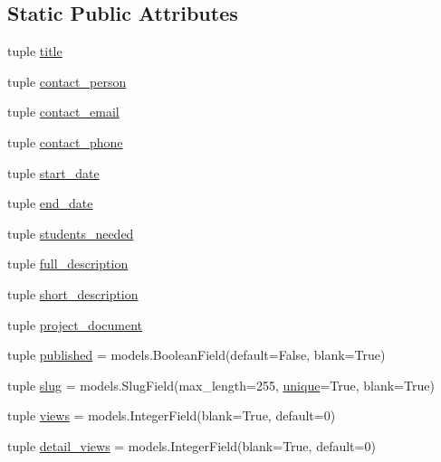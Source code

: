 \subsection*{Static Public Attributes}
\begin{DoxyCompactItemize}
\item 
tuple \hyperlink{classprojects_1_1models_1_1_project_a95d8dc587248d689b9d859eab80ded77}{title}
\item 
tuple \hyperlink{classprojects_1_1models_1_1_project_a5b80bb906ad5a041a2113b8bd70a2f7b}{contact\-\_\-person}
\item 
tuple \hyperlink{classprojects_1_1models_1_1_project_aa04216a538c373eb1c53f638e025d49a}{contact\-\_\-email}
\item 
tuple \hyperlink{classprojects_1_1models_1_1_project_a4f9549b40bff6b64d1ee32524b3c6dfb}{contact\-\_\-phone}
\item 
tuple \hyperlink{classprojects_1_1models_1_1_project_ae7c2fba1b45662e8ff60977fbe3df5d8}{start\-\_\-date}
\item 
tuple \hyperlink{classprojects_1_1models_1_1_project_a7f570ace2dbd44b86ebab9b717258216}{end\-\_\-date}
\item 
tuple \hyperlink{classprojects_1_1models_1_1_project_a520a39ed8efd4fef0a9fda1f3ea1aea3}{students\-\_\-needed}
\item 
tuple \hyperlink{classprojects_1_1models_1_1_project_a0237877a127da9130ea51a2056443c26}{full\-\_\-description}
\item 
tuple \hyperlink{classprojects_1_1models_1_1_project_a85804e6a4300a17857178cfbc6765c09}{short\-\_\-description}
\item 
tuple \hyperlink{classprojects_1_1models_1_1_project_af3244144358cfcb1060672bb74756a49}{project\-\_\-document}
\item 
tuple \hyperlink{classprojects_1_1models_1_1_project_a486a7d980b96c990599a4ee3832aeda9}{published} = models.\-Boolean\-Field(default=False, blank=True)
\item 
tuple \hyperlink{classprojects_1_1models_1_1_project_ad9ce364f353425978667daf8a8d3ccd3}{slug} = models.\-Slug\-Field(max\-\_\-length=255, \hyperlink{jquery_8min_8js_a8ac9d5c1e90c48e6dd7efb7db22f1093}{unique}=True, blank=True)
\item 
tuple \hyperlink{classprojects_1_1models_1_1_project_a5ef6dd18bd6267968bbfafdb6e0e6143}{views} = models.\-Integer\-Field(blank=True, default=0)
\item 
tuple \hyperlink{classprojects_1_1models_1_1_project_a0a82dba36ca5ebbab78b5d58400ea2f3}{detail\-\_\-views} = models.\-Integer\-Field(blank=True, default=0)

\end{DoxyCompactItemize}

